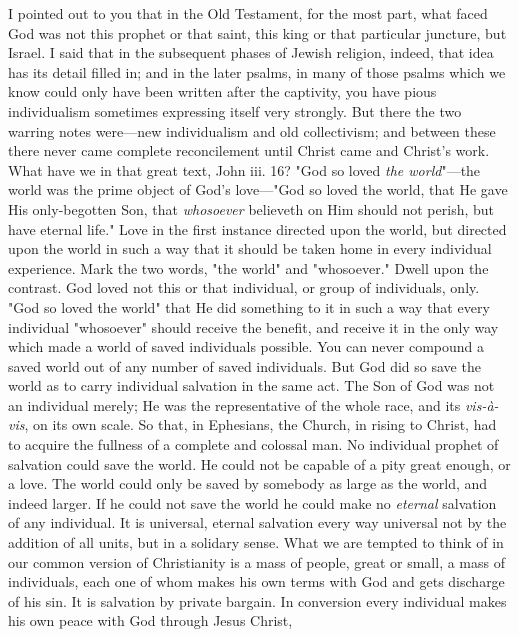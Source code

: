 \documentclass[draft]{ptfdoc}
\begin{document}
I pointed out to you that in the Old Testament, 
for the most part, what faced God was not 
this prophet or that saint, this king or that particular 
juncture, but Israel. I said that in the 
subsequent phases of Jewish religion, indeed, 
that idea has its detail filled in; and in the later 
psalms, in many of those psalms which we know 
could only have been written after the captivity, 
you have pious individualism sometimes expressing 
itself very strongly. But there the two warring 
notes were---new individualism and old collectivism; 
and between these there never came 
complete reconcilement until Christ came and 
Christ's work. What have we in that great text, 
John iii. 16? "God so loved \textit{the world}"---the world 
was the prime object of God's love---"God so 
loved the world, that He gave His only-begotten 
Son, that \textit{whosoever} believeth on Him should not 
perish, but have eternal life." Love in the first 
instance directed upon the world, but directed 
upon the world in such a way that it should be 
taken home in every individual experience. 
Mark the two words, "the world" and "whosoever." 
Dwell upon the contrast. God loved 
not this or that individual, or group of individuals, 
only. "God so loved the world" that 
He did something to it in such a way that every 
individual "whosoever" should receive the benefit, 
and receive it in the only way which made 
a world of saved individuals possible. You can 
never compound a saved world out of any 
number of saved individuals. But God did so 
save the world as to carry individual salvation 
in the same act. The Son of God was not an 
individual merely; He was the representative of 
the whole race, and its \textit{vis-\`{a}-vis}, on its own scale. 
So that, in Ephesians, the Church, in rising to 
Christ, had to acquire the fullness of a complete 
and colossal man. No individual prophet of salvation 
could save the world. He could not be 
capable of a pity great enough, or a love. The 
world could only be saved by somebody as large 
as the world, and indeed larger. If he could 
not save the world he could make no \textit{eternal} 
salvation of any individual. It is universal, 
eternal salvation every way universal not by 
the addition of all units, but in a solidary sense. 
What we are tempted to think of in our common 
version of Christianity is a mass of people, great 
or small, a mass of individuals, each one of 
whom makes his own terms with God and gets 
discharge of his sin. It is salvation by private 
bargain. In conversion every individual makes 
his own peace with God through Jesus Christ, 
\end{document}
